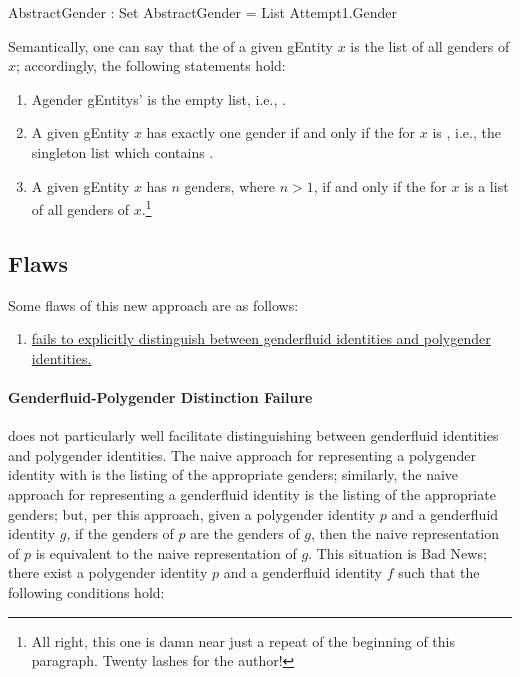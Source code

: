 \documentclass{article}
\theoremstyle{remark}
\begin{document}
\begin{code}
  AbstractGender : Set
  AbstractGender = List Attempt1.Gender
\end{code}

Semantically, one can say that the  of a given \gls{gEntity} \(x\) is the list of all genders of \(x\); accordingly, the following statements hold:

\begin{enumerate}
  \item Agender \glspl{gEntity}'  is the empty list, i.e., \AgdaInductiveConstructor{[]}.
  \item A given \gls{gEntity} \(x\) has exactly one gender  if and only if the  for \(x\) is \AgdaOperator{\AgdaFunction{[}}  \AgdaOperator{\AgdaFunction{]}}, i.e., the singleton list which contains .
  \item A given \gls{gEntity} \(x\) has \(n\) genders, where \(n > 1\), if and only if the  for \(x\) is a list of all genders of \(x\).\footnote{All right, this one is damn near just a repeat of the beginning of this paragraph.  Twenty lashes for the author!}
\end{enumerate}

\subsection{Flaws}\label{sec:gender3flaws}
Some flaws of this new approach are as follows:

\begin{enumerate}
  \item \hyperref[sec:gender3DistinctionFailure]{ fails to explicitly distinguish between genderfluid identities and polygender identities.}\label{enum:gender2genderfluidOrPolygender}
\end{enumerate}

\paragraph{Genderfluid-Polygender Distinction Failure}\label{sec:gender3DistinctionFailure}
 does not particularly well facilitate distinguishing between genderfluid identities and polygender identities.  The naive approach for representing a polygender identity with  is the listing of the appropriate genders; similarly, the naive approach for representing a genderfluid identity is the listing of the appropriate genders; but, per this approach, given a polygender identity \(p\) and a genderfluid identity \(g\), if the genders of \(p\) are the genders of \(g\), then the naive  representation of \(p\) is equivalent to the naive  representation of \(g\).  This situation is Bad News; there exist a polygender identity \(p\) and a genderfluid identity \(f\) such that the following conditions hold:
\end{document}
